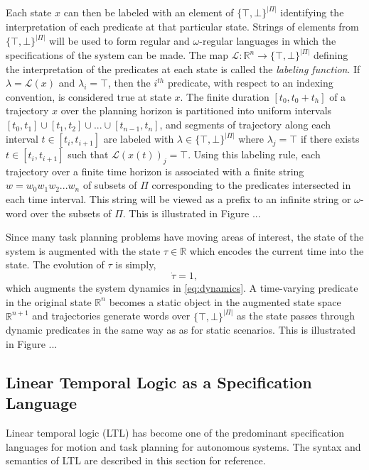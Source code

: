 \documentclass{llncs}
\begin{document}
%
Each state $x$ can then be labeled with an element of $\{\top,\bot\}^{|\Pi|}$ identifying the interpretation of each predicate at that particular state.
%
Strings of elements from $\{\top,\bot\}^{|\Pi|}$ will be used to form regular and $\omega$-regular languages in which the specifications of the system can be made.
%
The map $\mathcal{L}:\mathbb{R}^n\rightarrow \{\top,\bot\}^{|\Pi|}$ defining the interpretation of the predicates at each state is called the \emph{labeling function}. 
%
If $\lambda = \mathcal{L}(x)$ and $\lambda_i=\top$, then the $i^{th}$ predicate, with respect to an indexing convention, is considered true at state $x$. 
%
The finite duration $[t_0,t_0+t_h]$ of a trajectory $x$ over the planning horizon is partitioned into uniform intervals $[t_0,t_1]\cup[t_1,t_2]\cup ... \cup[t_{n-1},t_n]$, and segments of trajectory along each interval $t\in[t_i,t_{i+1}]$ are labeled with $\lambda\in\{\top,\bot\}^{|\Pi|}$ where $\lambda_j=\top$ if there exists $t\in[t_i,t_{i+1}]$ such that $\mathcal{L}(x(t))_j=\top$.
%
Using this labeling rule, each trajectory over a finite time horizon is associated with a finite string $w=w_0w_1w_2...w_n$ of subsets of $\Pi$ corresponding to the predicates intersected in each time interval.
%
This string will be viewed as a prefix to an infinite string or $\omega$-word over the subsets of $\Pi$.
%
This is illustrated in Figure ... 

Since many task planning problems have moving areas of interest, the state of the system is augmented with the state $\tau\in \mathbb{R}$ which encodes the current time into the state.
%
The evolution of $\tau$ is simply,
\begin{equation}
\dot{\tau}=1,
\end{equation}
which augments the system dynamics in \eqref{eq:dynamics}.
%
A time-varying predicate in the original state $\mathbb{R}^n$ becomes a static object in the augmented state space $\mathbb{R}^{n+1}$ and trajectories generate words over $\{\top,\bot\}^{|\Pi|}$ as the state passes through dynamic predicates in the same way as  as for static scenarios. 
%
This is illustrated in Figure ...



\subsection{Linear Temporal Logic as a Specification Language}
Linear temporal logic (LTL) has become one of the predominant specification languages for motion and task planning for autonomous systems.
%
The syntax and semantics of LTL are described in this section for reference.
%
\end{document}
